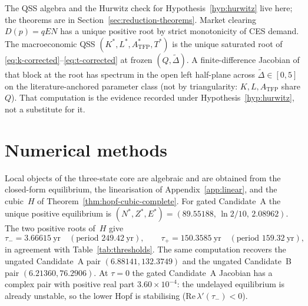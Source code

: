 \documentclass[11pt]{article}
\theoremstyle{definition}
\begin{document}
The QSS algebra and the Hurwitz check for Hypothesis~\ref{hyp:hurwitz} live here; the theorems are in Section~\ref{sec:reduction-theorems}. Market clearing $D(p)=qEN$ has a unique positive root by strict monotonicity of CES demand. The macroeconomic QSS $(K^*,L^*,A_{\mathrm{TFP}}^*,T^*)$ is the unique saturated root of \eqref{eq:k-corrected}--\eqref{eq:t-corrected} at frozen $(Q,\widetilde\Delta)$. A finite-difference Jacobian of that block at the root has spectrum in the open left half-plane across $\widetilde\Delta\in[0,5]$ on the literature-anchored parameter class (not by triangularity: $K,L,A_{\mathrm{TFP}}$ share $Q$). That computation is the evidence recorded under Hypothesis~\ref{hyp:hurwitz}, not a substitute for it.

\section{Numerical methods}
\label{app:methods}

Local objects of the three-state core are algebraic and are obtained from the closed-form equilibrium, the linearisation of Appendix~\ref{app:linear}, and the cubic~$H$ of Theorem~\ref{thm:hopf-cubic-complete}. For gated Candidate~A the unique positive equilibrium is $(N^*,Z^*,E^*)=(89.55188,\,\ln 2/10,\,2.08962)$. The two positive roots of~$H$ give
\[
\tau_-=3.66615~\mathrm{yr}\quad(\text{period }249.42~\mathrm{yr}),\qquad
\tau_+=150.3585~\mathrm{yr}\quad(\text{period }159.32~\mathrm{yr}),
\]
in agreement with Table~\ref{tab:thresholds}. The same computation recovers the ungated Candidate~A pair $(6.88141,132.3749)$ and the ungated Candidate~B pair $(6.21360,76.2906)$. At $\tau=0$ the gated Candidate~A Jacobian has a complex pair with positive real part $3.60\times 10^{-4}$: the undelayed equilibrium is already unstable, so the lower Hopf is stabilising ($\mathrm{Re}\,\lambda'(\tau_-)<0$).
\end{document}
